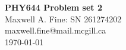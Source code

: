 \documentclass[11pt]{article}
\begin{document}
\begin{center}
    {\Large \textbf{PHY644 Problem set 2}}\\
    Maxwell A. Fine: SN 261274202 \\ 
    maxwell.fine@mail.mcgill.ca \\
    \today
\end{center}






\end{document}
